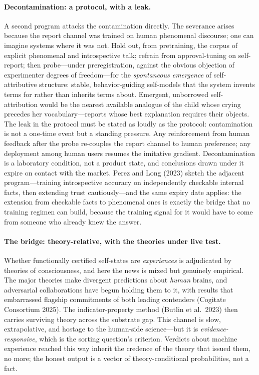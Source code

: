 \documentclass[11pt]{article}
\begin{document}
\paragraph{Decontamination: a protocol, with a leak.} A second program attacks the contamination directly. The severance arises because the report channel was trained on human phenomenal discourse; one can imagine systems where it was not. Hold out, from pretraining, the corpus of explicit phenomenal and introspective talk; refrain from approval-tuning on self-report; then probe---under preregistration, against the obvious objection of experimenter degrees of freedom---for the \emph{spontaneous emergence} of self-attributive structure: stable, behavior-guiding self-models that the system invents terms for rather than inherits terms about. Emergent, unborrowed self-attribution would be the nearest available analogue of the child whose crying precedes her vocabulary---reports whose best explanation requires their objects. The leak in the protocol must be stated as loudly as the protocol: contamination is not a one-time event but a standing pressure. Any reinforcement from human feedback after the probe re-couples the report channel to human preference; any deployment among human users resumes the imitative gradient. Decontamination is a laboratory condition, not a product state, and conclusions drawn under it expire on contact with the market. Perez and Long (2023) sketch the adjacent program---training introspective accuracy on independently checkable internal facts, then extending trust cautiously---and the same expiry date applies: the extension from checkable facts to phenomenal ones is exactly the bridge that no training regimen can build, because the training signal for it would have to come from someone who already knew the answer.

\paragraph{The bridge: theory-relative, with the theories under live test.} Whether functionally certified self-states are \emph{experiences} is adjudicated by theories of consciousness, and here the news is mixed but genuinely empirical. The major theories make divergent predictions about \emph{human} brains, and adversarial collaborations have begun holding them to it, with results that embarrassed flagship commitments of both leading contenders (Cogitate Consortium 2025). The indicator-property method (Butlin et al.\ 2023) then carries surviving theory across the substrate gap. This channel is slow, extrapolative, and hostage to the human-side science---but it is \emph{evidence-responsive}, which is the sorting question's criterion. Verdicts about machine experience reached this way inherit the credence of the theory that issued them, no more; the honest output is a vector of theory-conditional probabilities, not a fact.
\end{document}

